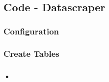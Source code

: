\subsection{Code - Datascraper}
\subsubsection{Configuration}


\subsubsection{Create Tables}







\subsubsection{•}
